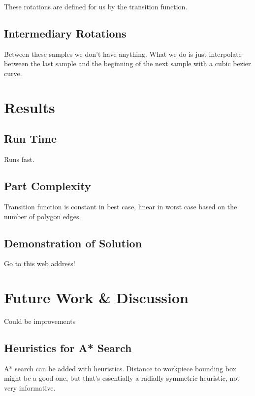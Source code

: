 These rotations are defined for us by the transition function.

	\subsection{Intermediary Rotations}

Between these samples we don't have anything. What we do is just interpolate between the last sample and the beginning of the next sample with a cubic bezier curve.

\section{Results}

	\subsection{Run Time}

Runs fast.

	\subsection{Part Complexity}

Transition function is constant in best case, linear in worst case based on the number of polygon edges.

	\subsection{Demonstration of Solution}

Go to this web address!

\section{Future Work \& Discussion}

Could be improvements

	\subsection{Heuristics for A* Search}

A* search can be added with heuristics. Distance to workpiece bounding box might be a good one, but that's essentially a radially symmetric heuristic, not very informative.
